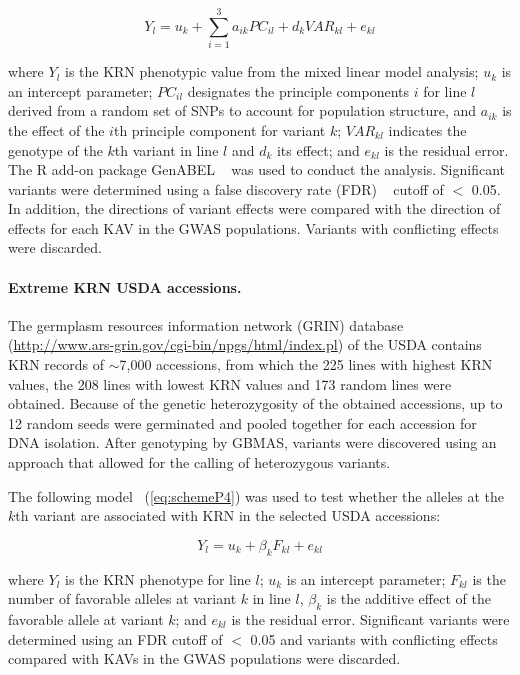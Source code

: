 \documentclass[10pt,letterpaper]{article}
\begin{document}
\begin{equation}\label{eq:schemeP3} 
Y_l = u_k + \sum_{i=1}^3 a_{ik}PC_{il} + d_kVAR_{kl} + e_{kl}
\end{equation}

where $Y_l$ is the KRN phenotypic value from the mixed linear model analysis; $u_k$ is an intercept parameter; $PC_{il}$ designates the principle components $i$ for line $l$ derived from a random set of SNPs to account for population structure, and $a_{ik}$ is the effect of the $i$th principle component for variant $k$; $VAR_{kl}$ indicates the genotype of the $k$th variant in line $l$ and $d_k$ its effect; and $e_{kl}$ is the residual error. The R add-on package GenABEL ~\cite{Aulchenko2007} was used to conduct the analysis. Significant variants were determined using a false discovery rate (FDR) ~\cite{Benjamini1995} cutoff of $<$ 0.05. In addition, the directions of variant effects were compared with the direction of effects for each KAV in the GWAS populations. Variants with conflicting effects were discarded. 

\paragraph{Extreme KRN USDA accessions.}
The germplasm resources information network (GRIN) database (\url{http://www.ars-grin.gov/cgi-bin/npgs/html/index.pl}) of the USDA contains KRN records of $\sim$7,000 accessions, from which the 225 lines with highest KRN values, the 208 lines with lowest KRN values and 173 random lines were obtained. Because of the genetic heterozygosity of the obtained accessions, up to 12 random seeds were germinated and pooled together for each accession for DNA isolation. After genotyping by GBMAS, variants were discovered using an approach that allowed for the calling of heterozygous variants.

The following model ~(\ref{eq:schemeP4}) was used to test whether the alleles at the $k$th variant are associated with KRN in the selected USDA accessions:

\begin{equation}\label{eq:schemeP4} 
Y_l = u_k + \beta_k F_{kl} + e_{kl}
\end{equation}

where $Y_l$ is the KRN phenotype for line $l$; $u_k$ is an intercept parameter; $F_{kl}$ is the number of favorable alleles at variant $k$ in line $l$, $\beta_k$ is the additive effect of the favorable allele at variant $k$; and $e_{kl}$ is the residual error. Significant variants were determined using an FDR cutoff of $<$ 0.05 and variants with conflicting effects compared with KAVs in the GWAS populations were discarded.
%
\end{document}
